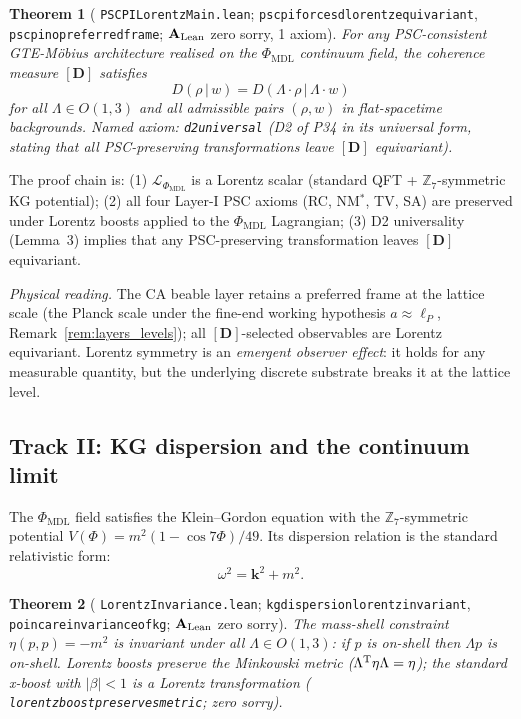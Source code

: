 \documentclass[11pt]{article}
\newtheorem{theorem}{Theorem}[section]
\theoremstyle{remark}
\newcommand{\PHIMDL}{\Phi_{\mathrm{MDL}}}
\newcommand{\ZS}{\mathbb{Z}_7}
\newcommand{\lean}[1]{%
  \penalty-100
  \begingroup\def\_{\textunderscore\allowbreak}\texttt{#1}\endgroup}
\newcommand{\CatAL}{\ensuremath{\textbf{A}_{\rm Lean}}}
\begin{document}
\begin{theorem}[\lean{PSCPILorentzMain.lean};
  \lean{psc\_pi\_forces\_d\_lorentz\_equivariant},
  \lean{psc\_pi\_no\_preferred\_frame}; \CatAL{} zero sorry, 1 axiom]
  \label{thm:psc_lorentz}
  For any PSC-consistent GTE-M\"obius architecture realised on the
  $\PHIMDL$ continuum field, the coherence measure $[\mathbf{D}]$ satisfies
  \begin{equation}
    D(\rho\,|\,w) = D(\Lambda\cdot\rho\,|\,\Lambda\cdot w)
  \end{equation}
  for all $\Lambda\in O(1,3)$ and all admissible pairs $(\rho,w)$
  in flat-spacetime backgrounds.
  Named axiom: \lean{d2\_universal} (D2 of P34 in its universal form,
  stating that all PSC-preserving transformations leave $[\mathbf{D}]$
  equivariant).
\end{theorem}

The proof chain is: (1) $\mathcal{L}_{\PHIMDL}$ is a Lorentz scalar
(standard QFT + $\ZS$-symmetric KG potential); (2) all four Layer-I PSC
axioms (RC, NM$^*$, TV, SA) are preserved under Lorentz boosts applied to
the $\PHIMDL$ Lagrangian; (3) D2 universality (Lemma~3) implies that
any PSC-preserving transformation leaves $[\mathbf{D}]$ equivariant.

\textit{Physical reading.}  The CA beable layer retains a preferred frame
at the lattice scale (the Planck scale under the fine-end working hypothesis
$a\approx\ell_P$, Remark~\ref{rem:layers_levels}); all
$[\mathbf{D}]$-selected observables are Lorentz
equivariant.  Lorentz symmetry is an \emph{emergent observer effect}: it
holds for any measurable quantity, but the underlying discrete substrate
breaks it at the lattice level.

\subsection{Track II: KG dispersion and the continuum limit}
\label{ssec:track2}

The $\PHIMDL$ field satisfies the Klein--Gordon equation with the
$\ZS$-symmetric potential $V(\Phi)=m^2(1-\cos 7\Phi)/49$.  Its dispersion
relation is the standard relativistic form:
\begin{equation}
  \label{eq:kg_dispersion}
  \omega^2 = \bm{k}^2 + m^2.
\end{equation}

\begin{theorem}[\lean{LorentzInvariance.lean};
  \lean{kg\_dispersion\_lorentz\_invariant},
  \lean{poincare\_invariance\_of\_kg}; \CatAL{} zero sorry]
  \label{thm:kg_lorentz}
  The mass-shell constraint $\eta(p,p)=-m^2$ is invariant under all
  $\Lambda\in O(1,3)$: if $p$ is on-shell then $\Lambda p$ is on-shell.
  Lorentz boosts preserve the Minkowski metric ($\Lambda^{\rm T}\eta\Lambda=\eta$);
  the standard x-boost with $|\beta|<1$ is a Lorentz transformation
  (\lean{lorentz\_boost\_preserves\_metric}; zero sorry).
\end{theorem}
\end{document}
